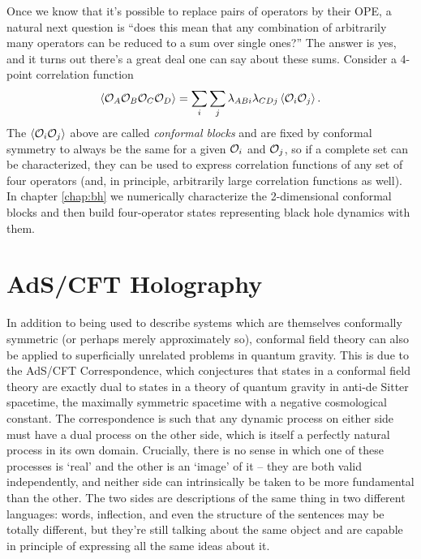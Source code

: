 Once we know that it's possible to replace pairs of operators by their OPE, a
natural next question is ``does this mean that any combination of arbitrarily
many operators can be reduced to a sum over single ones?'' The answer is yes,
and it turns out there's a great deal one can say about these sums. Consider a
4-point correlation function
\begin{equation}
    \left \langle {\cal O}_A {\cal O}_B {\cal O}_C {\cal O}_D \right \rangle
    = \sum_i \sum_j \lambda_{A B i} \lambda_{C D j} \left \langle {\cal O}_i
    {\cal O}_j \right \rangle.
\end{equation}
The $\left \langle {\cal O}_i {\cal O}_j \right \rangle$ above are called
\emph{conformal blocks} and are fixed by conformal symmetry to always be the 
same for a given ${\cal O}_i$ and ${\cal O}_j$, so if a complete set can be
characterized, they can be used to express correlation functions of any set of
four operators (and, in principle, arbitrarily large correlation functions as 
well). In chapter \ref{chap:bh} we numerically characterize the 2-dimensional
conformal blocks and then build four-operator states representing black hole
dynamics with them.

\section{AdS/CFT Holography}
\label{sec:adscft}

In addition to being used to describe systems which are themselves conformally
symmetric (or perhaps merely approximately so), conformal field theory can also
be applied to superficially unrelated problems in quantum gravity. This is due
to the AdS/CFT Correspondence, which conjectures that states in a conformal field
theory are exactly dual to states in a theory of quantum gravity in anti-de 
Sitter spacetime, the maximally symmetric spacetime with a negative cosmological
constant\cite{Maldacena}. The correspondence is such that any dynamic process on 
either side must have a dual process on the other side, which is itself a 
perfectly natural process in its own domain. Crucially, there is no sense in 
which one of these processes is `real' and the other is an `image' of it -- they 
are both valid independently, and neither side can intrinsically be taken to be 
more fundamental than the other. The two sides are descriptions of the same 
thing in two different languages: words, inflection, and even the structure of 
the sentences may be totally different, but they're still talking about the same
object and are capable in principle of expressing all the same ideas about it.

